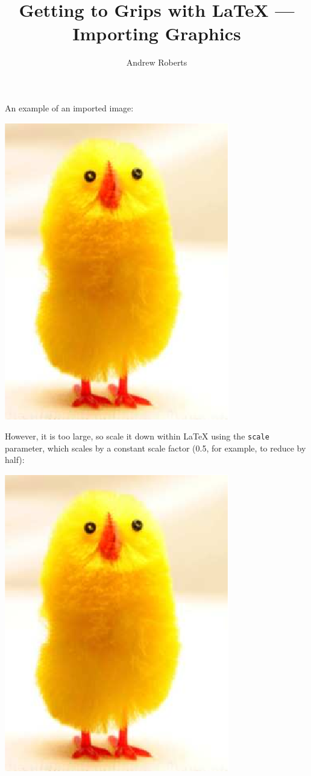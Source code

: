 \documentclass[english]{article}
\begin{document}
\title{Getting to Grips with \LaTeX{} --- Importing Graphics}
\author{Andrew Roberts}
\maketitle

An example of an imported image:

\begin{center}
  \includegraphics{chick-img.png}
\end{center}

However, it is too large, so scale it down within \LaTeX{} using the
\texttt{scale} parameter, which scales by a constant
scale factor (0.5, for example, to reduce by half):

\begin{center}
  \includegraphics[scale=0.5]{chick-img.png}
\end{center}
\end{document}
